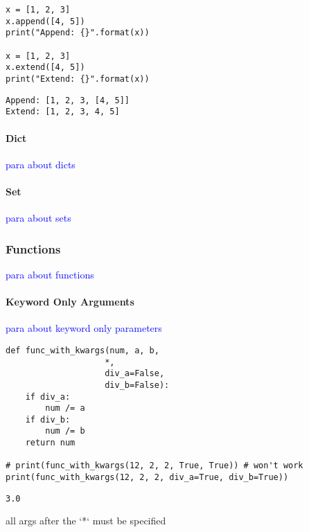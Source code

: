 \begin{lstlisting}[style=pyInStyle]
x = [1, 2, 3]
x.append([4, 5])
print("Append: {}".format(x))

x = [1, 2, 3]
x.extend([4, 5])
print("Extend: {}".format(x))
\end{lstlisting}
\begin{lstlisting}[style=pyOutStyle]
Append: [1, 2, 3, [4, 5]]
Extend: [1, 2, 3, 4, 5]
\end{lstlisting}


\paragraph{Dict}

\textcolor{blue}{para about dicts}

\paragraph{Set}

\textcolor{blue}{para about sets}

\subsubsection{Functions}

\textcolor{blue}{para about functions}

\paragraph{Keyword Only Arguments}

\textcolor{blue}{para about keyword only parameters}

\begin{lstlisting}[style=pyInStyle]
def func_with_kwargs(num, a, b,
                    *,
                    div_a=False,
                    div_b=False):
    if div_a:
        num /= a
    if div_b:
        num /= b
    return num

# print(func_with_kwargs(12, 2, 2, True, True)) # won't work
print(func_with_kwargs(12, 2, 2, div_a=True, div_b=True))
\end{lstlisting}
\begin{lstlisting}[style=pyOutStyle]
3.0
\end{lstlisting}
\begin{markdown}
all args after the `*` must be specified
\end{markdown}


